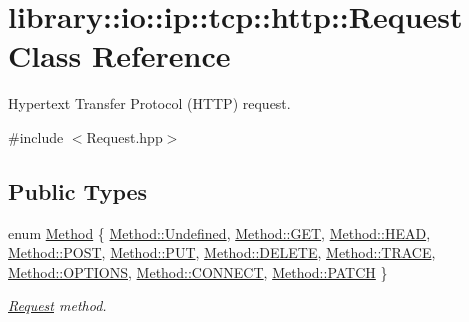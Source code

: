 \hypertarget{classlibrary_1_1io_1_1ip_1_1tcp_1_1http_1_1_request}{}\section{library\+:\+:io\+:\+:ip\+:\+:tcp\+:\+:http\+:\+:Request Class Reference}
\label{classlibrary_1_1io_1_1ip_1_1tcp_1_1http_1_1_request}


Hypertext Transfer Protocol (H\+T\+TP) request.  




{\ttfamily \#include $<$Request.\+hpp$>$}

\subsection*{Public Types}
\begin{DoxyCompactItemize}
\item 
enum \hyperlink{classlibrary_1_1io_1_1ip_1_1tcp_1_1http_1_1_request_a45baccf3aec384fbdbbf6ce411f11bd7}{Method} \{ \newline
\hyperlink{classlibrary_1_1io_1_1ip_1_1tcp_1_1http_1_1_request_a45baccf3aec384fbdbbf6ce411f11bd7aec0fc0100c4fc1ce4eea230c3dc10360}{Method\+::\+Undefined}, 
\hyperlink{classlibrary_1_1io_1_1ip_1_1tcp_1_1http_1_1_request_a45baccf3aec384fbdbbf6ce411f11bd7a7528035a93ee69cedb1dbddb2f0bfcc8}{Method\+::\+G\+ET}, 
\hyperlink{classlibrary_1_1io_1_1ip_1_1tcp_1_1http_1_1_request_a45baccf3aec384fbdbbf6ce411f11bd7ae15e216fc1c639f787b1231ecdfa1bf8}{Method\+::\+H\+E\+AD}, 
\hyperlink{classlibrary_1_1io_1_1ip_1_1tcp_1_1http_1_1_request_a45baccf3aec384fbdbbf6ce411f11bd7aa02439ec229d8be0e74b0c1602392310}{Method\+::\+P\+O\+ST}, 
\newline
\hyperlink{classlibrary_1_1io_1_1ip_1_1tcp_1_1http_1_1_request_a45baccf3aec384fbdbbf6ce411f11bd7a3e75383a5992a6d15fb81e872e46e256}{Method\+::\+P\+UT}, 
\hyperlink{classlibrary_1_1io_1_1ip_1_1tcp_1_1http_1_1_request_a45baccf3aec384fbdbbf6ce411f11bd7a32f68a60cef40faedbc6af20298c1a1e}{Method\+::\+D\+E\+L\+E\+TE}, 
\hyperlink{classlibrary_1_1io_1_1ip_1_1tcp_1_1http_1_1_request_a45baccf3aec384fbdbbf6ce411f11bd7a2d3e4144aa384b18849ab9a8abad74d6}{Method\+::\+T\+R\+A\+CE}, 
\hyperlink{classlibrary_1_1io_1_1ip_1_1tcp_1_1http_1_1_request_a45baccf3aec384fbdbbf6ce411f11bd7a164dd62adb30ca051b5289672a572f9b}{Method\+::\+O\+P\+T\+I\+O\+NS}, 
\newline
\hyperlink{classlibrary_1_1io_1_1ip_1_1tcp_1_1http_1_1_request_a45baccf3aec384fbdbbf6ce411f11bd7ab57e2519e26151feacdbe52076bc39ec}{Method\+::\+C\+O\+N\+N\+E\+CT}, 
\hyperlink{classlibrary_1_1io_1_1ip_1_1tcp_1_1http_1_1_request_a45baccf3aec384fbdbbf6ce411f11bd7a63bc9a3997d66d835d9f3ec29451407d}{Method\+::\+P\+A\+T\+CH}
 \}\begin{DoxyCompactList}\small\item\em \hyperlink{classlibrary_1_1io_1_1ip_1_1tcp_1_1http_1_1_request}{Request} method. \end{DoxyCompactList}
\end{DoxyCompactItemize}
